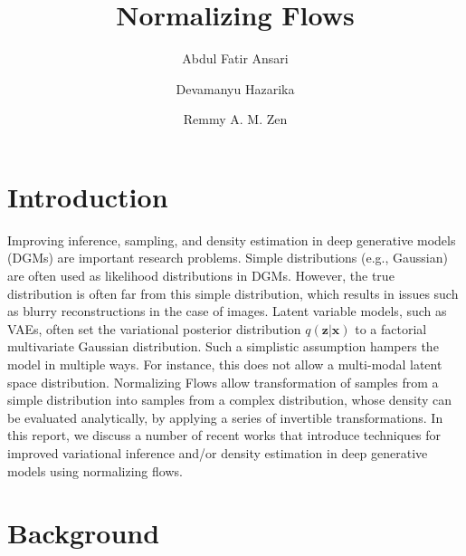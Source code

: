 \documentclass[runningheads]{llncs}
\begin{document}
%
\title{Normalizing Flows}
%
%
\author{Abdul Fatir Ansari \and
Devamanyu Hazarika\and
Remmy A. M. Zen}
%
%
%
\maketitle              %
%
%
%
%
\section{Introduction}
Improving inference, sampling, and density estimation in deep generative models (DGMs) are important research problems. Simple distributions (e.g., Gaussian) are often used as likelihood distributions in DGMs. However, the true distribution is often far from this simple distribution, which results in issues such as blurry reconstructions in the case of images. Latent variable models, such as VAEs, often set the variational posterior distribution $q(\mathbf{z}|\mathbf{x})$ to a factorial multivariate Gaussian distribution. Such a simplistic assumption hampers the model in multiple ways. For instance, this does not allow a multi-modal latent space distribution. Normalizing Flows allow transformation of samples from a simple distribution into samples from a complex distribution, whose density can be evaluated analytically, by applying a series of invertible transformations. In this report, we discuss a number of recent works that introduce techniques for improved variational inference and/or density estimation in deep generative models using normalizing flows. 
\section{Background}
\end{document}
